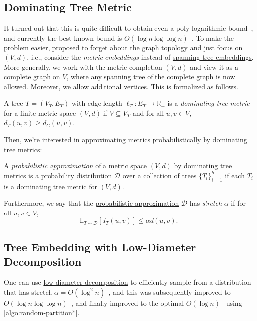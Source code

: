 \subsection{Dominating Tree Metric}
It turned out that this is quite difficult to obtain even a poly-logarithmic bound~\cite{elkin2005lower}, and currently the best known bound is \(O(\log n \log \log n)\)~\cite{abraham2008nearly}. To make the problem easier, \cite{bartal1996probabilistic} proposed to forget about the graph topology and just focus on \((V, d)\), i.e., consider the \emph{metric embeddings} instead of \hyperref[prb:tree-embedding]{spanning tree embeddings}. More generally, we work with the metric completion \((V, d)\) and view it as a complete graph on \(V\), where any \hyperref[def:spanning-tree]{spanning tree} of the complete graph is now allowed. Moreover, we allow additional vertices. This is formalized as follows.

\begin{definition}\label{def:dominating-tree-metric}
	A tree \(T = (V_T, E_T)\) with edge length \(\ell _T \colon E_T \to \mathbb{R} _{+}\) is a \emph{dominating tree metric} for a finite metric space \((V, d)\) if \(V \subseteq V_T\) and for all \(u, v \in V\), \(d_T(u, v) \geq d_G(u, v)\).
\end{definition}

Then, we're interested in approximating metrics probabilistically by \hyperref[def:dominating-tree-metric]{dominating tree metrics}:

\begin{definition}\label{def:probabilistic-approximation}
	A \emph{probabilistic approximation} of a metric space \((V, d)\) by \hyperref[def:dominating-tree-metric]{dominating tree metrics} is a probability distribution \(\mathcal{D} \) over a collection of trees \(\{ T_i \} _{i = 1}^{h}\) if each \(T_i\) is a \hyperref[def:dominating-tree-metric]{dominating tree metric} for \((V, d)\).
\end{definition}

Furthermore, we say that the \hyperref[def:probabilistic-approximation]{probabilistic approximation} \(\mathcal{D} \) has \emph{stretch} \(\alpha \) if for all \(u, v \in V\),
\[
	\mathbb{E}_{T \sim \mathcal{D} }[d_T(u, v)]
	\leq \alpha d(u, v).
\]

\subsection{Tree Embedding with Low-Diameter Decomposition}
One can use \hyperref[def:low-diameter-decomposition]{low-diameter decomposition} to efficiently sample from a distribution that has stretch \(\alpha = O(\log ^2 n)\)~\cite{bartal1996probabilistic}, and this was subsequently improved to \(O(\log n \log \log n)\)~\cite{bartal1998approximating}, and finally improved to the optimal \(O(\log n)\)~\cite{fakcharoenphol2003tight} using \autoref{algo:random-partition*}.

